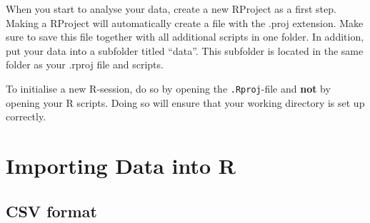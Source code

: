 \documentclass[
  letterpaper,
  DIV=11,
  numbers=noendperiod]{scrreprt}
\begin{document}
\begin{tcolorbox}[enhanced jigsaw, rightrule=.15mm, colframe=quarto-callout-tip-color-frame, breakable, opacityback=0, bottomrule=.15mm, arc=.35mm, left=2mm, leftrule=.75mm, toprule=.15mm, colback=white]
\begin{minipage}[t]{5.5mm}
\textcolor{quarto-callout-tip-color}{\faLightbulb}
\end{minipage}%
\begin{minipage}[t]{\textwidth - 5.5mm}

When you start to analyse your data, create a new RProject as a first
step. Making a RProject will automatically create a file with the .proj
extension. Make sure to save this file together with all additional
scripts in one folder. In addition, put your data into a subfolder
titled ``data''. This subfolder is located in the same folder as your
.rproj file and scripts.

\end{minipage}%
\end{tcolorbox}

\begin{tcolorbox}[enhanced jigsaw, rightrule=.15mm, colframe=quarto-callout-caution-color-frame, breakable, opacityback=0, bottomrule=.15mm, arc=.35mm, left=2mm, leftrule=.75mm, toprule=.15mm, colback=white]
\begin{minipage}[t]{5.5mm}
\textcolor{quarto-callout-caution-color}{\faFire}
\end{minipage}%
\begin{minipage}[t]{\textwidth - 5.5mm}

To initialise a new R-session, do so by opening the \texttt{.Rproj}-file
and \textbf{not} by opening your R scripts. Doing so will ensure that
your working directory is set up correctly.

\end{minipage}%
\end{tcolorbox}


\hypertarget{importing-data-into-r}{%
\chapter{Importing Data into R}\label{importing-data-into-r}}

\hfill\break

\hypertarget{csv-format}{%
\section{CSV format}\label{csv-format}}
\end{document}
